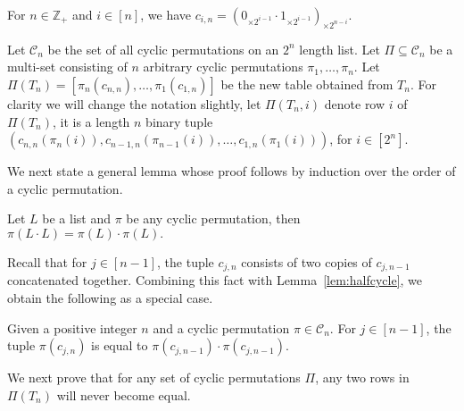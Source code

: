 \begin{observation}
 \label{obs:zero-one-power}
 For $n\in\mathbb{Z}_+$ and $i\in [n]$, we have
  $c_{i,n}= (0_{\times 2^{i-1}} \cdot 1_{\times 2^{i-1}})_{\times 2^{n-i}}$.
\end{observation}

Let $\mathcal{C}_n$ be the set of all cyclic permutations on an $2^n$ length list.
Let $\Pi \subseteq \mathcal{C}_n$ be a multi-set consisting of $n$ arbitrary cyclic permutations $\pi_1, \ldots, \pi_n$.
Let $\Pi(T_n)=[\pi_n(c_{n,n}),\dots,\pi_1(c_{1,n})]$ be the new table obtained from $T_n$. 
For clarity we will change the notation slightly, let $\Pi(T_n,i)$ denote row $i$ of $\Pi(T_n)$, it is a length $n$ binary tuple
$(c_{n,n}(\pi_n(i)),  c_{n-1,n}(\pi_{n-1}(i)), \ldots, c_{1,n}(\pi_1(i)))$,
for $i \in [2^n]$.

We next state a general lemma whose proof follows by induction over the order of a cyclic permutation.

\begin{lemma}
\label{lem:halfcycle}
Let $L$ be a list and $\pi$ be any cyclic permutation, then $\pi(L\cdot L)= \pi(L)\cdot \pi(L).$
\end{lemma}

Recall that for $j\in [n-1]$, the tuple $c_{j,n}$ consists of two copies of $c_{j,n-1}$ concatenated together. Combining this fact with Lemma~\ref{lem:halfcycle}, we obtain the following as a special case.

\begin{corollary}
\label{cor:halfcycle}
 Given a positive integer $n$ and a cyclic permutation $\pi \in \mathcal{C}_n$.
 For $j \in [n-1]$, the tuple $\pi(c_{j,n})$ is equal to $\pi(c_{j,n-1}) \cdot \pi(c_{j,n-1})$.
\end{corollary}

We next prove that for any set of cyclic permutations $\Pi$, any two rows in $\Pi(T_n)$ will never become equal.

